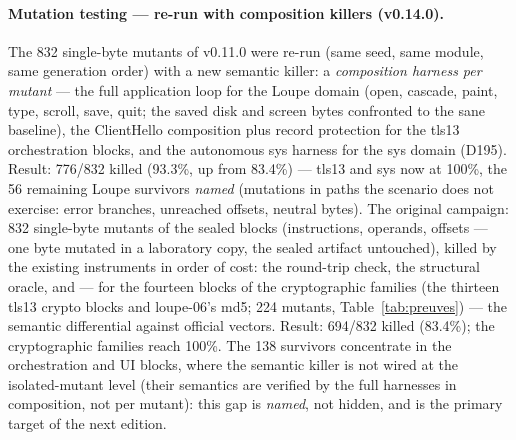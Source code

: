\documentclass[10pt,a4paper]{article}
\begin{document}
\paragraph{Mutation testing --- re-run with composition killers (v0.14.0).} The 832
single-byte mutants of v0.11.0 were re-run (same seed, same module,
same generation order) with a new semantic killer: a \emph{composition
harness per mutant} --- the full application loop for the Loupe domain
(open, cascade, paint, type, scroll, save, quit; the saved disk and
screen bytes confronted to the sane baseline), the ClientHello composition
plus record protection for the tls13 orchestration blocks, and the
autonomous sys harness for the sys domain (D195). Result: 776/832
killed (93.3\%, up from 83.4\%) --- tls13 and sys now at 100\%, the
56 remaining Loupe survivors \emph{named} (mutations in paths the
scenario does not exercise: error branches, unreached offsets,
neutral bytes). The original campaign: 832 single-byte mutants of the sealed blocks
(instructions, operands, offsets --- one byte mutated in a laboratory copy,
the sealed artifact untouched), killed by the existing instruments in
order of cost: the round-trip check, the structural oracle, and --- for the fourteen
blocks of the cryptographic families (the thirteen tls13 crypto blocks
and loupe-06's md5; 224 mutants, Table~\ref{tab:preuves}) --- the
semantic differential against official vectors. Result: 694/832 killed (83.4\%);
the cryptographic families reach 100\%. The 138 survivors concentrate in
the orchestration and UI blocks, where the semantic killer is not wired
at the isolated-mutant level (their semantics are verified by the full
harnesses in composition, not per mutant): this gap is \emph{named}, not
hidden, and is the primary target of the next edition.
\end{document}
